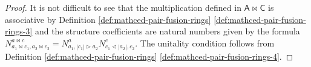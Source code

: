 \documentclass[10pt,a4paper]{amsart}
\newcommand{\degf}[1]{\left|#1\right|}
\newcommand{\fiz}{\triangleleft}
\newcommand{\fizb}{\blacktriangleleft}
\newcommand{\trid}{\triangleright}
\newcommand{\tridb}{\blacktriangleright}
\begin{document}
\begin{proof} It is not difficult to see that the multiplication defined in $\mathsf{A}\bowtie \mathsf{C}$ is associative by Definition \ref{def:mathced-pair-fusion-rings} \ref{def:mathced-pair-fusion-rings-3} and the structure coefficients are natural numbers given by the formula $N^{a\bowtie c}_{a_1\bowtie c_1, a_2\bowtie c_2}=N^a_{a_1, \degf{c_1}\trid a_2}N^c_{c_1\fiz \degf{a_2}, c_2}$. The unitality condition follows from Definition \ref{def:mathced-pair-fusion-rings} \ref{def:mathced-pair-fusion-rings-4}.



\end{proof}
\end{document}
